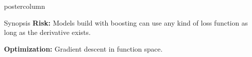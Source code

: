 \documentclass{beamer}
\begin{document}
\begin{frame}[fragile]{}
\begin{columns}
\begin{column}{.31\textwidth}
\begin{beamercolorbox}[center]{postercolumn}
\begin{minipage}{.98\textwidth}
{\begin{myblock}{Synopsis}
        \textbf{Risk:}
          Models build with boosting can use any kind of loss function as long as the derivative exists.
          \vspace*{1ex}

        \textbf{Optimization:}
          Gradient descent in function space.
          \end{myblock}
      }
    \end{minipage}
  \end{beamercolorbox}
\end{column}


\end{columns}
\end{frame}
\end{document}
